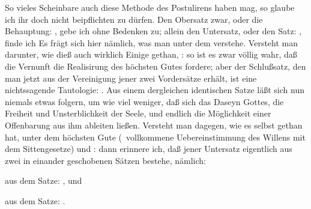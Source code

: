 \begin{aufza}
\item So vieles Scheinbare auch diese Methode des Postulirens haben mag, so glaube ich ihr doch nicht beipflichten zu dürfen. Den Obersatz zwar, oder die Behauptung: , gebe ich ohne Bedenken zu; allein den Untersatz, oder den Satz: , finde ich  Es frägt sich hier nämlich, was man unter dem  verstehe. Versteht man darunter, wie dieß auch wirklich Einige gethan, : so ist es zwar völlig wahr, daß die Vernunft die Realisirung des höchsten Gutes fordere; aber der Schlußsatz, den man jetzt aus der Vereinigung jener zwei Vordersätze erhält, ist eine nichtssagende Tautologie: . Aus einem dergleichen identischen Satze läßt sich nun niemals etwas folgern, um wie viel weniger, daß sich das Daseyn Gottes, die Freiheit und Unsterblichkeit der Seele, und endlich die Möglichkeit einer Offenbarung aus ihm ableiten ließen. Versteht man dagegen, wie es  selbst gethan hat, unter dem höchsten Gute  (\dh\ vollkommene Uebereinstimmung des Willens mit dem Sittengesetze) und : dann erinnere ich, daß jener Untersatz eigentlich aus zwei in einander geschobenen Sätzen bestehe, nämlich: 
\begin{inparaenum} 
\item aus dem Satze: , und 
\item aus dem Satze: .
\end{inparaenum}

\end{aufza}
